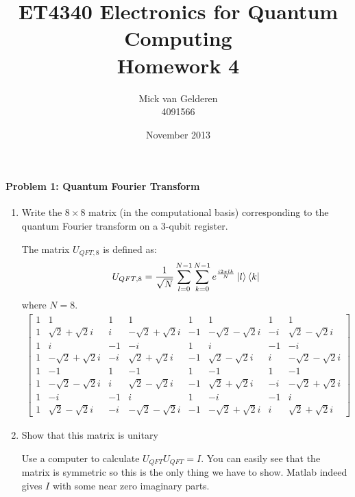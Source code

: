\documentclass[12pt]{article}
\title{ET4340 Electronics for Quantum Computing\\Homework 4}
\author{
    Mick van Gelderen\\4091566
}
\date{November 2013}
\newcommand{\bmat}[1]{\begin{bmatrix}#1\end{bmatrix}}
\newcommand{\rsqrt}[1]{\ensuremath{\frac{1}{\sqrt{#1}}}}
\newenvironment{answer}{\begingroup\setlength{\leftskip}{-\leftmargin}\begin{framed}}{\end{framed}\endgroup}
\begin{document}
\maketitle

\paragraph{Problem 1: Quantum Fourier Transform} \hfill

\begin{enumerate}

    \item Write the $8\times8$ matrix (in the computational basis) corresponding to the quantum Fourier transform on a 3-qubit register.

    \begin{answer}
        The matrix $U_{QFT,8}$ is defined as:
        \begin{align*}
            U_{QFT,8} = \rsqrt{N}\sum\limits_{l = 0}^{N - 1}\sum\limits_{k = 0}^{N - 1}e^{\frac{i2\pi{}lk}{N}}\ket{l}\bra{k}
        \end{align*}
        where $N = 8$.
        \begin{align*}\bmat{
            1 &  1 &  1 &  1 &  1 &  1 &  1 &  1 \\
            1 &  \sqrt{2} + \sqrt{2}i & i & -\sqrt{2} + \sqrt{2}i & -1 & -\sqrt{2} - \sqrt{2}i & -i &  \sqrt{2} - \sqrt{2}i \\
            1 & i & -1 & -i &  1 & i & -1 & -i \\
            1 & -\sqrt{2} + \sqrt{2}i & -i &  \sqrt{2} + \sqrt{2}i & -1 &  \sqrt{2} - \sqrt{2}i & i & -\sqrt{2} - \sqrt{2}i \\
            1 & -1 &  1 & -1 &  1 & -1 &  1 & -1 \\
            1 & -\sqrt{2} - \sqrt{2}i & i &  \sqrt{2} - \sqrt{2}i & -1 &  \sqrt{2} + \sqrt{2}i & -i & -\sqrt{2} + \sqrt{2}i \\
            1 & -i & -1 & i &  1 & -i & -1 & i \\
            1 &  \sqrt{2} - \sqrt{2}i & -i & -\sqrt{2} - \sqrt{2}i & -1 & -\sqrt{2} + \sqrt{2}i & i &  \sqrt{2} + \sqrt{2}i
        }\end{align*}
    \end{answer}

    \item Show that this matrix is unitary

    \begin{answer}
        Use a computer to calculate $U_{QFT}U_{QFT} = I$. You can easily see that the matrix is symmetric so this is the only thing we have to show.
        Matlab indeed gives $I$ with some near zero imaginary parts.
    \end{answer}


\end{enumerate}
\end{document}
